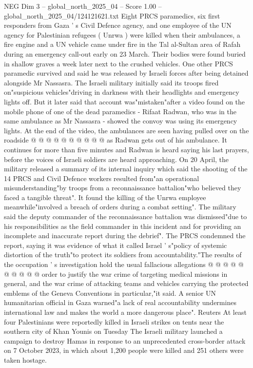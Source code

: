 \begin{textsample}{NEG Dim 3 – global\_north\_2025\_04 – Score 1.00 – global\_north\_2025\_04/124121621.txt}  \label{ex:f3_neg_417}
Eight PRCS paramedics, six first responders from Gaza ' s Civil Defence agency, and one employee of the UN agency for Palestinian refugees ( Unrwa ) were killed when their ambulances, a fire engine and a UN vehicle came under fire in the Tal al-Sultan area of Rafah during an emergency call-out early on 23 March.
Their bodies were found buried in shallow graves a week later next to the crushed vehicles.
One other PRCS paramedic survived and said he was released by Israeli forces after being detained alongside Mr Nassasra.
The Israeli military initially said its troops fired on"suspicious vehicles"driving in darkness with their headlights and emergency lights off.
But it later said that account was"mistaken"after a video found on the mobile phone of one of the dead paramedics - Rifaat Radwan, who was in the same ambulance as Mr Nassasra - showed the convoy was using its emergency lights.
At the end of the video, the ambulances are seen having pulled over on the roadside @ @ @ @ @ @ @ @ @ @ as Radwan gets out of his ambulance.
It continues for more than five minutes and Radwan is heard saying his last prayers, before the voices of Israeli soldiers are heard approaching.
On 20 April, the military released a summary of its internal inquiry which said the shooting of the 14 PRCS and Civil Defence workers resulted from"an operational misunderstanding"by troops from a reconnaissance battalion"who believed they faced a tangible threat".
It found the killing of the Unrwa employee meanwhile"involved a breach of orders during a combat setting".
The military said the deputy commander of the reconnaissance battalion was dismissed"due to his responsibilities as the field commander in this incident and for providing an incomplete and inaccurate report during the debrief".
The PRCS condemned the report, saying it was evidence of what it called Israel ' s"policy of systemic distortion of the truth"to protect its soldiers from accountability."The results of the occupation ' s investigation hold the usual fallacious allegations @ @ @ @ @ @ @ @ @ @ order to justify the war crime of targeting medical missions in general, and the war crime of attacking teams and vehicles carrying the protected emblems of the Geneva Conventions in particular,"it said.
A senior UN humanitarian official in Gaza warned"a lack of real accountability undermines international law and makes the world a more dangerous place".
Reuters At least four Palestinians were reportedly killed in Israeli strikes on tents near the southern city of Khan Younis on Tuesday The Israeli military launched a campaign to destroy Hamas in response to an unprecedented cross-border attack on 7 October 2023, in which about 1,200 people were killed and 251 others were taken hostage.

\end{textsample}

